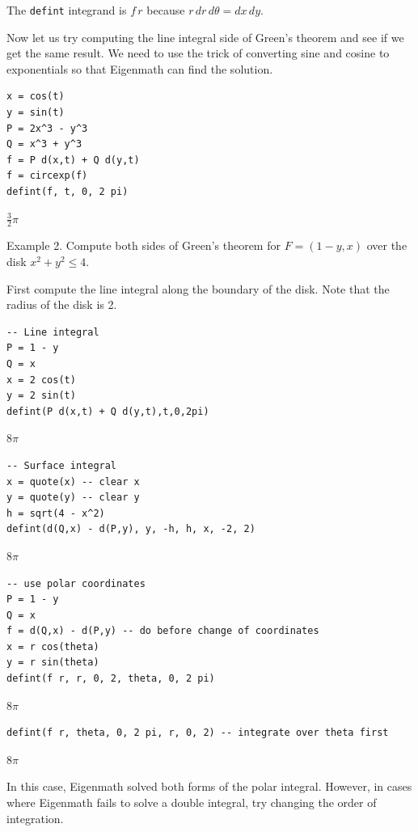\documentclass[12pt]{article}
\begin{document}
\bigskip
The \verb$defint$ integrand is $f\,r$ because $r\,dr\,d\theta=dx\,dy$.

\bigskip
Now let us try computing the line integral side of Green's theorem
and see if we get the same result.
We need to use the trick of converting sine and cosine to exponentials
so that Eigenmath can find the solution.

{\color{blue}
\begin{verbatim}
x = cos(t)
y = sin(t)
P = 2x^3 - y^3
Q = x^3 + y^3
f = P d(x,t) + Q d(y,t)
f = circexp(f)
defint(f, t, 0, 2 pi)
\end{verbatim}
}

$\displaystyle \tfrac{3}{2}\pi$

\bigskip
Example 2.
Compute both sides of Green's theorem for
$F=(1-y,x)$ over the disk $x^2+y^2\le4$.

\bigskip
First compute the line integral along the boundary of the disk.
Note that the radius of the disk is 2.

{\color{blue}
\begin{verbatim}
-- Line integral
P = 1 - y
Q = x
x = 2 cos(t)
y = 2 sin(t)
defint(P d(x,t) + Q d(y,t),t,0,2pi)
\end{verbatim}
}

$\displaystyle 8\pi$

{\color{blue}
\begin{verbatim}
-- Surface integral
x = quote(x) -- clear x
y = quote(y) -- clear y
h = sqrt(4 - x^2)
defint(d(Q,x) - d(P,y), y, -h, h, x, -2, 2)
\end{verbatim}
}

$\displaystyle 8\pi$

{\color{blue}
\begin{verbatim}
-- use polar coordinates
P = 1 - y
Q = x
f = d(Q,x) - d(P,y) -- do before change of coordinates
x = r cos(theta)
y = r sin(theta)
defint(f r, r, 0, 2, theta, 0, 2 pi)
\end{verbatim}
}

$\displaystyle 8\pi$

{\color{blue}
\begin{verbatim}
defint(f r, theta, 0, 2 pi, r, 0, 2) -- integrate over theta first
\end{verbatim}
}

$\displaystyle 8\pi$

\bigskip
In this case, Eigenmath solved both forms of the polar integral.
However, in cases where Eigenmath fails to solve a double integral, try
changing the order of integration.
\end{document}
